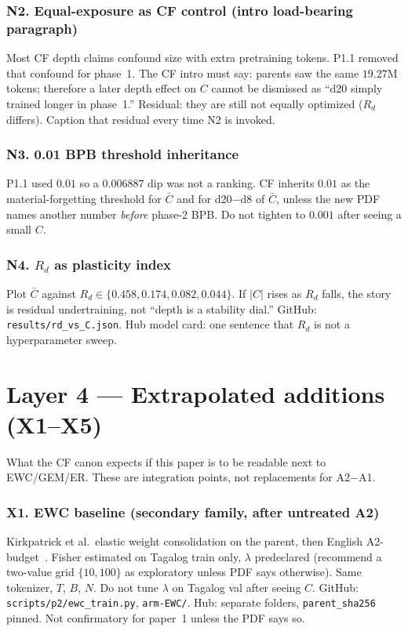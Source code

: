 \documentclass[11pt,a4paper]{article}
\begin{document}
\subsubsection*{N2. Equal-exposure as CF control (intro load-bearing paragraph)}
Most CF depth claims confound size with extra pretraining tokens. P1.1 removed that confound for phase~1. The CF intro must say: parents saw the same $19.27$M tokens; therefore a later depth effect on $C$ cannot be dismissed as ``d20 simply trained longer in phase~1.'' Residual: they are still not equally optimized ($R_d$ differs). Caption that residual every time N2 is invoked.

\subsubsection*{N3. 0.01 BPB threshold inheritance}
P1.1 used $0.01$ so a $0.006887$ dip was not a ranking. CF inherits $0.01$ as the material-forgetting threshold for $\bar C$ and for d20$-$d8 of $\bar C$, unless the new PDF names another number \emph{before} phase-2 BPB. Do not tighten to $0.001$ after seeing a small $C$.

\subsubsection*{N4. $R_d$ as plasticity index}
Plot $\bar C$ against $R_d\in\{0.458,0.174,0.082,0.044\}$. If $|C|$ rises as $R_d$ falls, the story is residual undertraining, not ``depth is a stability dial.'' GitHub: \texttt{results/rd\_vs\_C.json}. Hub model card: one sentence that $R_d$ is not a hyperparameter sweep.

\section{Layer 4 --- Extrapolated additions (X1--X5)}
\label{sec:L4}

What the CF canon expects if this paper is to be readable next to EWC/GEM/ER. These are integration points, not replacements for A2$-$A1.

\subsubsection*{X1. EWC baseline (secondary family, after untreated A2)}
Kirkpatrick et al.\ elastic weight consolidation on the parent, then English A2-budget~\cite{kirkpatrick2017ewc}. Fisher estimated on Tagalog train only, $\lambda$ predeclared (recommend a two-value grid $\{10,100\}$ as exploratory unless PDF says otherwise). Same tokenizer, $T$, $B$, $N$. Do not tune $\lambda$ on Tagalog val after seeing $C$. GitHub: \texttt{scripts/p2/ewc\_train.py}, \texttt{arm-EWC/}. Hub: separate folders, \texttt{parent\_sha256} pinned. Not confirmatory for paper~1 unless the PDF says so.
\end{document}
